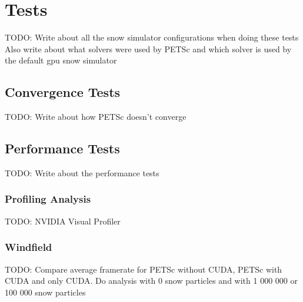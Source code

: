 \section{Tests}

TODO: Write about all the snow simulator configurations when doing these tests
Also write about what solvers were used by PETSc and which solver is used
by the default gpu snow simulator

\subsection{Convergence Tests}

TODO: Write about how PETSc doesn't converge

\subsection{Performance Tests}

TODO: Write about the performance tests

\subsubsection{Profiling Analysis}

TODO: NVIDIA Visual Profiler

\subsubsection{Windfield}

TODO: Compare average framerate for PETSc without CUDA, PETSc with CUDA and only CUDA.
Do analysis with 0 snow particles and with 1 000 000 or 100 000 snow particles 
